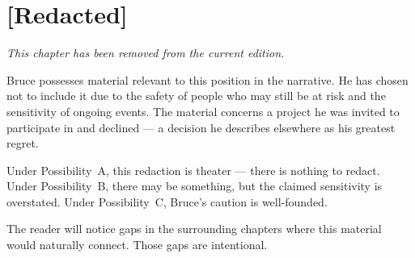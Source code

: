 
\chapter{[Redacted]}
\label{ch:redacted-chapter}

\vspace{2cm}

\begin{center}
\large\textit{This chapter has been removed from the current edition.}

\vspace{1cm}

\normalsize
Bruce possesses material relevant to this position in the narrative. He has chosen not to include it due to the safety of people who may still be at risk and the sensitivity of ongoing events. The material concerns a project he was invited to participate in and declined --- a decision he describes elsewhere as his greatest regret.

\vspace{0.5cm}

Under Possibility~A, this redaction is theater --- there is nothing to redact. Under Possibility~B, there may be something, but the claimed sensitivity is overstated. Under Possibility~C, Bruce's caution is well-founded.

\vspace{0.5cm}

The reader will notice gaps in the surrounding chapters where this material would naturally connect. Those gaps are intentional.
\end{center}

\chapterreturn
